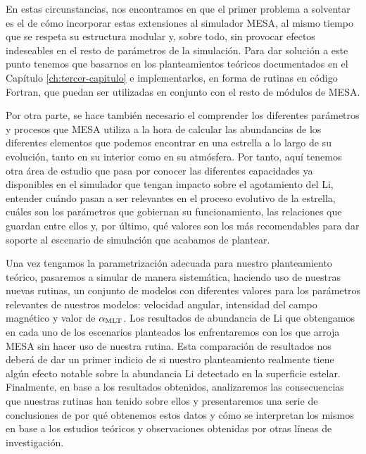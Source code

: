 En estas circunstancias, nos encontramos en que el primer problema a solventar es el de cómo incorporar estas extensiones al simulador MESA, al mismo tiempo que se respeta su estructura modular y, sobre todo, sin provocar efectos indeseables en el resto de parámetros de la simulación. Para dar solución a este punto tenemos que basarnos en los planteamientos teóricos documentados en el Capítulo \ref{ch:tercer-capitulo} e implementarlos, en forma de rutinas en código Fortran, que puedan ser utilizadas en conjunto con el resto de módulos de MESA.\par

Por otra parte, se hace también necesario el comprender los diferentes parámetros y procesos que MESA utiliza a la hora de calcular las abundancias de los diferentes elementos que podemos encontrar en una estrella a lo largo de su evolución, tanto en su interior como en su atmósfera. Por tanto, aquí tenemos otra área de estudio que pasa por conocer las diferentes capacidades ya disponibles en el simulador que tengan impacto sobre el agotamiento del Li, entender cuándo pasan a ser relevantes en el proceso evolutivo de la estrella, cuáles son los parámetros que gobiernan su funcionamiento, las relaciones que guardan entre ellos y, por último, qué valores son los más recomendables para dar soporte al escenario de simulación que acabamos de plantear.\par

Una vez tengamos la parametrización adecuada para nuestro planteamiento teórico, pasaremos a simular de manera sistemática, haciendo uso de nuestras nuevas rutinas, un conjunto de modelos con diferentes valores para los parámetros relevantes de nuestros modelos: velocidad angular, intensidad del campo magnético y valor de $\alpha_{\mathrm{MLT}}$. Los resultados de abundancia de Li que obtengamos en cada uno de los escenarios planteados los enfrentaremos con los que arroja MESA sin hacer uso de nuestra rutina. Esta comparación de resultados nos deberá de dar un primer indicio de si nuestro planteamiento realmente tiene algún efecto notable sobre la abundancia Li detectado en la superficie estelar. Finalmente, en base a los resultados obtenidos, analizaremos las consecuencias que nuestras rutinas han tenido sobre ellos y presentaremos una serie de conclusiones de por qué obtenemos estos datos y cómo se interpretan los mismos en base a los estudios teóricos y observaciones obtenidas por otras líneas de investigación.\par

